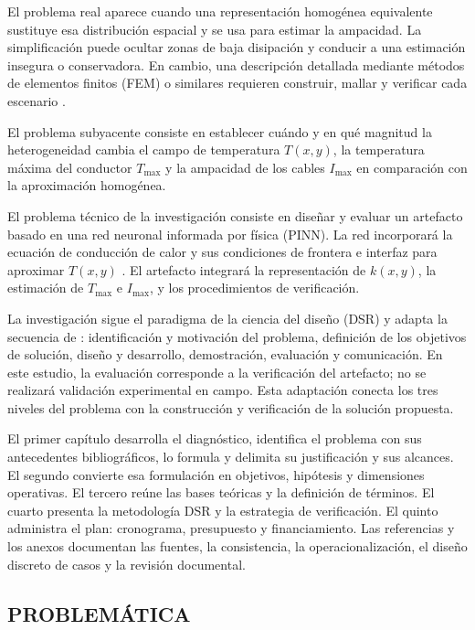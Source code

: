 \documentclass[11pt,a4paper,oneside]{report}
\newcommand{\Tmax}{T_{\max}}
\newcommand{\Imax}{I_{\max}}
\newcommand{\kx}{k(x,y)}
\begin{document}
El problema real aparece cuando una representación homogénea equivalente sustituye esa distribución espacial y se usa para estimar la ampacidad. La simplificación puede ocultar zonas de baja disipación y conducir a una estimación insegura o conservadora. En cambio, una descripción detallada mediante métodos de elementos finitos (FEM) o similares requieren construir, mallar y verificar cada escenario \parencites[41--42,93--99]{cigre2025}[1--3,12]{aldulaimi2024}.

El problema subyacente consiste en establecer cuándo y en qué magnitud la heterogeneidad cambia el campo de temperatura \(T(x,y)\), la temperatura máxima del conductor \(\Tmax\) y la ampacidad de los cables \(\Imax\) en comparación con la aproximación homogénea.

El problema técnico de la investigación consiste en diseñar y evaluar un artefacto basado en una red neuronal informada por física (PINN). La red incorporará la ecuación de conducción de calor y sus condiciones de frontera e interfaz para aproximar \(T(x,y)\) \parencite{raissi2019}. El artefacto integrará la representación de \(\kx\), la estimación de \(\Tmax\) e \(\Imax\), y los procedimientos de verificación.

La investigación sigue el paradigma de la ciencia del diseño (DSR) y adapta la secuencia de \textcite[54--56]{peffers2007}: identificación y motivación del problema, definición de los objetivos de solución, diseño y desarrollo, demostración, evaluación y comunicación. En este estudio, la evaluación corresponde a la verificación del artefacto; no se realizará validación experimental en campo. Esta adaptación conecta los tres niveles del problema con la construcción y verificación de la solución propuesta.

El primer capítulo desarrolla el diagnóstico, identifica el problema con sus antecedentes bibliográficos, lo formula y delimita su justificación y sus alcances. El segundo convierte esa formulación en objetivos, hipótesis y dimensiones operativas. El tercero reúne las bases teóricas y la definición de términos. El cuarto presenta la metodología DSR y la estrategia de verificación. El quinto administra el plan: cronograma, presupuesto y financiamiento. Las referencias y los anexos documentan las fuentes, la consistencia, la operacionalización, el diseño discreto de casos y la revisión documental.

\subsection{PROBLEMÁTICA}
\end{document}
